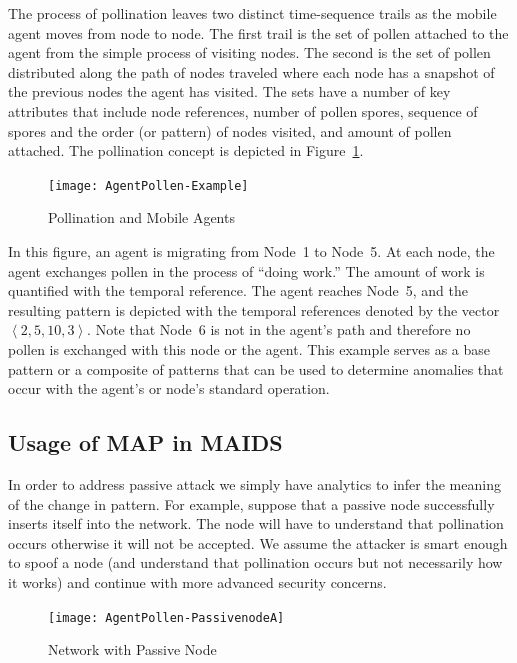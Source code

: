\documentclass{acm_proc_article-sp}
\begin{document}
The process of pollination leaves two distinct time-sequence trails as the mobile agent moves from node to node.  The first trail is the set of pollen attached to the agent from the simple process of visiting nodes.  The second is the set of pollen distributed along the path of nodes traveled where each node has a snapshot of the previous nodes the agent has visited.  The sets have a number of key attributes that include node references, number of pollen spores, sequence of spores and the order (or pattern) of nodes visited, and amount of pollen attached.  The pollination concept is depicted in Figure~\ref{fig:map-overview}.

\begin{figure}
\centering
\texttt{[image: AgentPollen-Example]}
\caption{Pollination and Mobile Agents}
\label{fig:map-overview}
\end{figure}

In this figure, an agent is migrating from Node~1 to Node~5.  At each node, the agent exchanges pollen in the process of ``doing work.''  The amount of work is quantified with the temporal reference.  The agent reaches Node~5, and the resulting pattern is depicted with the temporal references denoted by the vector $\left<2, 5, 10, 3\right>$.  Note that Node~6 is not in the agent's path and therefore no pollen is exchanged with this node or the agent.  This example serves as a base pattern or a composite of patterns that can be used to determine anomalies that occur with the agent's or node's standard operation.

\subsection{Usage of MAP in MAIDS}
In order to address passive attack we simply have analytics to infer the meaning of the change in pattern.  For example, suppose that a passive node successfully inserts itself into the network.  The node will have to understand that pollination occurs otherwise it will not be accepted.  We assume the attacker is smart enough to spoof a node (and understand that pollination occurs but not necessarily how it works) and continue with more advanced security concerns.

\begin{figure}
\centering
\texttt{[image: AgentPollen-PassivenodeA]}
\caption{Network with Passive Node}
\label{fig:map-eg}
\end{figure}
\end{document}

